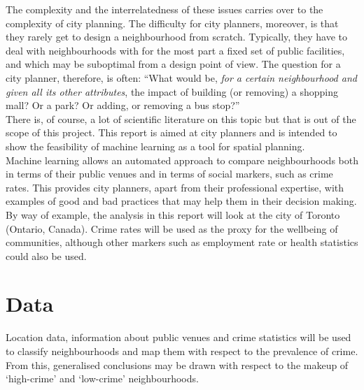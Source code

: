 \documentclass{article}
\begin{document}
The complexity and the interrelatedness of these issues carries over to the complexity of city planning. The difficulty for city planners, moreover, is that they rarely get to design a neighbourhood from scratch. Typically, they have to deal with neighbourhoods with for the most part a fixed set of public facilities, and which may be suboptimal from a design point of view. The question for a city planner, therefore, is often: ``What would be, \emph{for a certain neighbourhood and given all its other attributes}, the impact of building (or removing) a shopping mall? Or a park? Or adding, or removing a bus stop?''\\

There is, of course, a lot of scientific literature on this topic but that is out of the scope of this project. This report is aimed at city planners and is intended to show the feasibility of machine learning as a tool for spatial planning.\\
Machine learning allows an automated approach to compare neighbourhoods both in terms of their public venues and in terms of social markers, such as crime rates. This provides city planners, apart from their professional expertise, with examples of good and bad practices that may help them in their decision making.\\
By way of example, the analysis in this report will look at the city of Toronto (Ontario, Canada). Crime rates will be used as the proxy for the wellbeing of communities, although other markers such as employment rate or health statistics could also be used.

\section{Data}
Location data, information about public venues and crime statistics will be used to classify neighbourhoods and map them with respect to the prevalence of crime. From this, generalised conclusions may be drawn with respect to the makeup of `high-crime' and `low-crime' neighbourhoods. 
\end{document}
